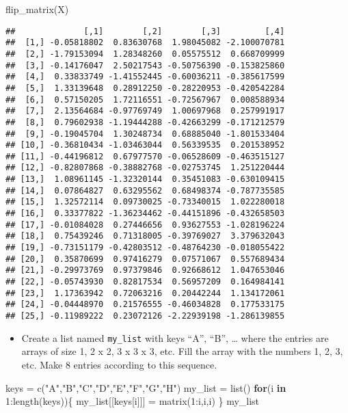 \documentclass[
]{article}
\newenvironment{Shaded}{\begin{snugshade}}{\end{snugshade}}
\newcommand{\ControlFlowTok}[1]{\textcolor[rgb]{0.13,0.29,0.53}{\textbf{#1}}}
\newcommand{\DecValTok}[1]{\textcolor[rgb]{0.00,0.00,0.81}{#1}}
\newcommand{\FunctionTok}[1]{\textcolor[rgb]{0.00,0.00,0.00}{#1}}
\newcommand{\NormalTok}[1]{#1}
\newcommand{\OtherTok}[1]{\textcolor[rgb]{0.56,0.35,0.01}{#1}}
\newcommand{\SpecialCharTok}[1]{\textcolor[rgb]{0.00,0.00,0.00}{#1}}
\newcommand{\StringTok}[1]{\textcolor[rgb]{0.31,0.60,0.02}{#1}}
\providecommand{\tightlist}{%
  \setlength{\itemsep}{0pt}\setlength{\parskip}{0pt}}
\begin{document}
\begin{Shaded}
\begin{Highlighting}[]
\FunctionTok{flip\_matrix}\NormalTok{(X)}
\end{Highlighting}
\end{Shaded}

\begin{verbatim}
##              [,1]        [,2]        [,3]         [,4]
##  [1,] -0.05818802  0.83630768  1.98045082 -2.100070781
##  [2,] -1.79153094  1.28348260  0.05575512  0.668709999
##  [3,] -0.14176047  2.50217543 -0.50756390 -0.153825860
##  [4,]  0.33833749 -1.41552445 -0.60036211 -0.385617599
##  [5,]  1.33139648  0.28912250 -0.28220953 -0.420542284
##  [6,]  0.57150205  1.72116551 -0.72567967  0.008588934
##  [7,]  2.13564684 -0.97769749  1.00697968  0.257991917
##  [8,]  0.79602938 -1.19444288 -0.42663299 -0.171212579
##  [9,] -0.19045704  1.30248734  0.68885040 -1.801533404
## [10,] -0.36810434 -1.03463044  0.56339535  0.201538952
## [11,] -0.44196812  0.67977570 -0.06528609 -0.463515127
## [12,] -0.82807868 -0.38882768 -0.02753745  1.251220444
## [13,]  1.08961145 -1.32320144  0.35451083 -0.630109415
## [14,]  0.07864827  0.63295562  0.68498374 -0.787735585
## [15,]  1.32572114  0.09730025 -0.73340015  1.022280018
## [16,]  0.33377822 -1.36234462 -0.44151896 -0.432658503
## [17,] -0.01084028  0.27446656  0.93627553 -1.028196224
## [18,]  0.75439246  0.71318005 -0.39769027  3.379632043
## [19,] -0.73151179 -0.42803512 -0.48764230 -0.018055422
## [20,]  0.35870699  0.97416279  0.07571067  0.557689434
## [21,] -0.29973769  0.97379846  0.92668612  1.047653046
## [22,] -0.05743930  0.82817534  0.56957209  0.164984141
## [23,]  1.17363942  0.72063216  0.20442244  1.134172061
## [24,] -0.04448970  0.21576555 -0.46034828  0.177533175
## [25,] -0.11989222  0.23072126 -2.22939198 -1.286139855
\end{verbatim}

\begin{itemize}
\tightlist
\item
  Create a list named \texttt{my\_list} with keys ``A'', ``B'', \ldots{}
  where the entries are arrays of size 1, 2 x 2, 3 x 3 x 3, etc. Fill
  the array with the numbers 1, 2, 3, etc. Make 8 entries according to
  this sequence.
\end{itemize}

\begin{Shaded}
\begin{Highlighting}[]
\NormalTok{keys }\OtherTok{=} \FunctionTok{c}\NormalTok{(}\StringTok{"A"}\NormalTok{,}\StringTok{"B"}\NormalTok{,}\StringTok{"C"}\NormalTok{,}\StringTok{"D"}\NormalTok{,}\StringTok{"E"}\NormalTok{,}\StringTok{"F"}\NormalTok{,}\StringTok{"G"}\NormalTok{,}\StringTok{"H"}\NormalTok{)}
\NormalTok{my\_list }\OtherTok{=} \FunctionTok{list}\NormalTok{()}
\ControlFlowTok{for}\NormalTok{(i }\ControlFlowTok{in} \DecValTok{1}\SpecialCharTok{:}\FunctionTok{length}\NormalTok{(keys))\{}
\NormalTok{  my\_list[[keys[i]]] }\OtherTok{=} \FunctionTok{matrix}\NormalTok{(}\DecValTok{1}\SpecialCharTok{:}\NormalTok{i,i,i)}
\NormalTok{\}}
\NormalTok{my\_list}
\end{Highlighting}
\end{Shaded}
\end{document}
